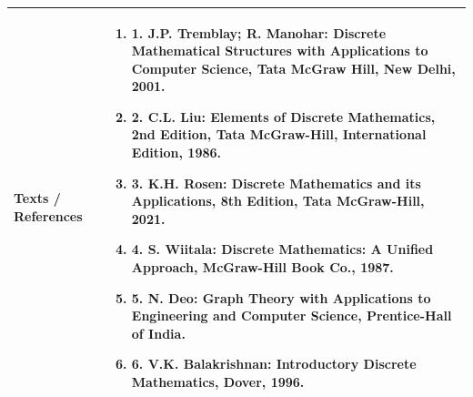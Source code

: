 \documentclass[11pt,a4paper]{article}
\begin{document}
\begin{tabularx}{\textwidth}{|p{3.2cm}|X|}
\hline
\textbf{Texts / References} & \begin{enumerate}[leftmargin=*,noitemsep,topsep=2pt]  \item 1. J.P. Tremblay; R. Manohar: Discrete Mathematical Structures with Applications to Computer  Science, Tata McGraw Hill, New Delhi, 2001.  \item 2. C.L. Liu: Elements of Discrete Mathematics, 2nd Edition, Tata McGraw-Hill, International  Edition, 1986.  \item 3. K.H. Rosen: Discrete Mathematics and its Applications, 8th Edition, Tata McGraw-Hill, 2021.  \item 4. S. Wiitala: Discrete Mathematics: A Unified Approach, McGraw-Hill Book Co., 1987.  \item 5. N. Deo: Graph Theory with Applications to Engineering and Computer Science, Prentice-Hall  of India.  \item 6. V.K. Balakrishnan: Introductory Discrete Mathematics, Dover, 1996.\end{enumerate} \\
\hline
\end{tabularx}
\clearpage
\end{document}
